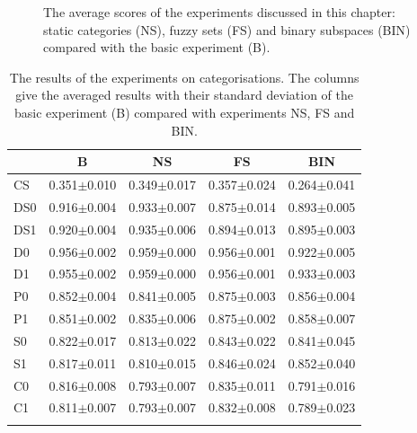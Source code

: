 \begin{figure}
\caption{The average scores of the experiments discussed in this chapter: static categories (NS), fuzzy sets (FS) and binary subspaces (BIN) compared with the basic experiment (B).}
\label{f:par:cat}
\end{figure}

\begin{table}[t]
\centering
\begin{tabular}{lcccc}
\lsptoprule
        & B               &   NS             &  FS             &  BIN\\\midrule
CS      & 0.351$\pm$0.010 &   0.349$\pm$0.017&  0.357$\pm$0.024&  0.264$\pm$0.041\\%
DS0     & 0.916$\pm$0.004 &   0.933$\pm$0.007&  0.875$\pm$0.014&  0.893$\pm$0.005\\%
DS1     & 0.920$\pm$0.004 &   0.935$\pm$0.006&  0.894$\pm$0.013&  0.895$\pm$0.003\\%
D0      & 0.956$\pm$0.002 &   0.959$\pm$0.000&  0.956$\pm$0.001&  0.922$\pm$0.005\\%
D1      & 0.955$\pm$0.002 &   0.959$\pm$0.000&  0.956$\pm$0.001&  0.933$\pm$0.003\\%
P0      & 0.852$\pm$0.004 &   0.841$\pm$0.005&  0.875$\pm$0.003&  0.856$\pm$0.004\\%
P1      & 0.851$\pm$0.002 &   0.835$\pm$0.006&  0.875$\pm$0.002&  0.858$\pm$0.007\\%
S0      & 0.822$\pm$0.017 &   0.813$\pm$0.022&  0.843$\pm$0.022&  0.841$\pm$0.045\\%
S1      & 0.817$\pm$0.011 &   0.810$\pm$0.015&  0.846$\pm$0.024&  0.852$\pm$0.040\\%
C0      & 0.816$\pm$0.008 &   0.793$\pm$0.007&  0.835$\pm$0.011&  0.791$\pm$0.016\\%
C1      & 0.811$\pm$0.007 &   0.793$\pm$0.007&  0.832$\pm$0.008&  0.789$\pm$0.023\\%
\lspbottomrule
\end{tabular}
\caption{The results of the experiments on categorisations. The columns give the averaged results with their standard deviation of the basic experiment (B) compared with experiments NS, FS and BIN.}
\label{t:par:cat}
\end{table}

